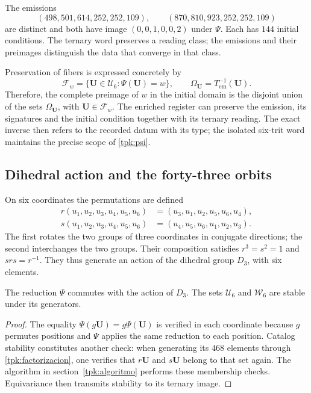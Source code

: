 \begin{ejemplo}
\label{tpk:colision}
The emissions
\[
 (498,501,614,252,252,109),\qquad
 (870,810,923,252,252,109)
\]
are distinct and both have image \((0,0,1,0,0,2)\) under \(\Psi\).
Each has \(144\) initial conditions. The ternary word preserves
a reading class; the emissions and their preimages distinguish the data
that converge in that class.
\end{ejemplo}

Preservation of fibers is expressed concretely by
\[
 \mathcal F_w=\{\mathbf U\in\mathcal U_6:\Psi(\mathbf U)=w\},
 \qquad
 \Omega_{\mathbf U}=T_{\mathrm{em}}^{-1}(\mathbf U).
\]
Therefore, the complete preimage of \(w\) in the initial domain is the
disjoint union of the sets \(\Omega_{\mathbf U}\), with
\(\mathbf U\in\mathcal F_w\). The enriched register can preserve the
emission, its signatures and the initial condition together with its ternary reading.
The exact inverse then refers to the recorded datum with its type;
the isolated six-trit word maintains the precise scope of
\eqref{tpk:psi}.

\subsection{Dihedral action and the forty-three orbits}
\label{tpk:orbitas}

On six coordinates the permutations are defined
\begin{align}
 r(u_1,u_2,u_3,u_4,u_5,u_6)
   &=(u_3,u_1,u_2,u_5,u_6,u_4),\\
 s(u_1,u_2,u_3,u_4,u_5,u_6)
   &=(u_4,u_5,u_6,u_1,u_2,u_3).
 \label{tpk:generadores-diedrales}
\end{align}
The first rotates the two groups of three coordinates in conjugate directions;
the second interchanges the two groups. Their composition satisfies
\(r^3=s^2=1\) and \(srs=r^{-1}\). They thus generate an action of the dihedral group
\(D_3\), with six elements.

\begin{proposicion}
\label{tpk:equivarianza}
The reduction \(\Psi\) commutes with the action of \(D_3\). The sets
\(\mathcal U_6\) and \(\mathcal W_6\) are stable under its generators.
\end{proposicion}
\begin{proof}
The equality \(\Psi(g\mathbf U)=g\Psi(\mathbf U)\) is verified in each
coordinate because \(g\) permutes positions and \(\Psi\) applies the same
reduction to each position. Catalog stability constitutes another
check: when generating its \(468\) elements through
\eqref{tpk:factorizacion}, one verifies that \(r\mathbf U\) and
\(s\mathbf U\) belong to that set again. The algorithm in
section~\ref{tpk:algoritmo} performs these membership checks.
Equivariance then transmits stability to its ternary image.
\end{proof}

